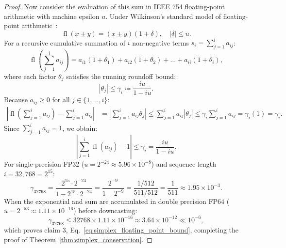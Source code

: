 \begin{proof}
Now consider the evaluation of this sum in IEEE 754 floating-point arithmetic with machine epsilon $u$.
Under Wilkinson's standard model of floating-point arithmetic~\cite{higham2002accuracy}:
\begin{equation}
\operatorname{fl}(x \pm y) = (x \pm y)(1 + \delta), \quad |\delta| \le u.
\end{equation}
For a recursive cumulative summation of $i$ non-negative terms $s_i = \sum_{j=1}^i a_{ij}$:
\begin{equation}
\operatorname{fl}\left(\sum_{j=1}^i a_{ij}\right) = a_{i1}(1 + \theta_1) + a_{i2}(1 + \theta_2) + \dots + a_{ii}(1 + \theta_i),
\end{equation}
where each factor $\theta_j$ satisfies the running roundoff bound:
\begin{equation}
|\theta_j| \le \gamma_i \coloneqq \frac{i u}{1 - i u}.
\end{equation}
Because $a_{ij} \ge 0$ for all $j \in \{1, \dots, i\}$:
\begin{align}
\left| \operatorname{fl}\left(\sum_{j=1}^i a_{ij}\right) - \sum_{j=1}^i a_{ij} \right| &= \left| \sum_{j=1}^i a_{ij} \theta_j \right| \le \sum_{j=1}^i a_{ij} |\theta_j| \le \gamma_i \sum_{j=1}^i a_{ij} = \gamma_i (1) = \gamma_i.
\end{align}
Since $\sum_{j=1}^i a_{ij} = 1$, we obtain:
\begin{equation}
\left| \sum_{j=1}^i \operatorname{fl}(a_{ij}) - 1 \right| \le \gamma_i = \frac{i u}{1 - i u}.
\end{equation}
For single-precision FP32 ($u = 2^{-24} \approx 5.96 \times 10^{-8}$) and sequence length $i = 32{,}768 = 2^{15}$:
\begin{equation}
\gamma_{32768} = \frac{2^{15} \cdot 2^{-24}}{1 - 2^{15} \cdot 2^{-24}} = \frac{2^{-9}}{1 - 2^{-9}} = \frac{1/512}{511/512} = \frac{1}{511} \approx 1.95 \times 10^{-3}.
\end{equation}
When the exponential and sum are accumulated in double precision FP64 ($u = 2^{-53} \approx 1.11 \times 10^{-16}$) before downcasting:
\begin{equation}
\gamma_{32768} \le 32768 \times 1.11 \times 10^{-16} \approx 3.64 \times 10^{-12} \ll 10^{-6},
\end{equation}
which proves claim 3, Eq.~\eqref{eq:simplex_floating_point_bound}, completing the proof of Theorem~\ref{thm:simplex_conservation}.
\end{proof}

